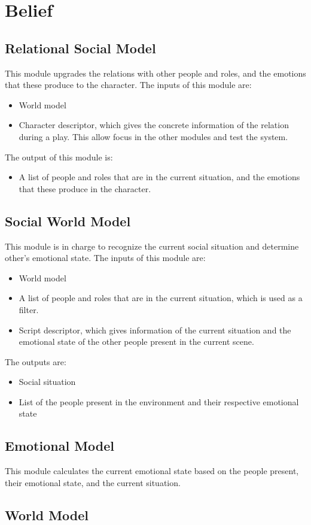 \section{Belief}
\subsection{Relational Social Model}
This module upgrades the relations with other people and roles, and the emotions that these produce to the character. The inputs of this module are:
\begin{itemize}
	\item World model
	\item Character descriptor, which gives the concrete information of the relation during a play. This allow focus in the other modules and test the system.
\end{itemize}
The output of this module is:
\begin{itemize}
	\item A list of people and roles that are in the current situation, and the emotions that these produce in the character.
\end{itemize}
\subsection{Social World Model}
This module is in charge to recognize the current social situation and determine other's emotional state. The inputs of this module are:
\begin{itemize}
	\item World model
	\item A list of people and roles that are in the current situation, which is used as a filter.
	\item Script descriptor, which gives information of the current situation and the emotional state of the other people present in the current scene.
\end{itemize}
The outputs are:
\begin{itemize}
	\item Social situation
	\item List of the people present in the environment and their respective emotional state
\end{itemize}
\subsection{Emotional Model}
This module calculates the current emotional state based on the people present, their emotional state, and the current situation.
\subsection{World Model}